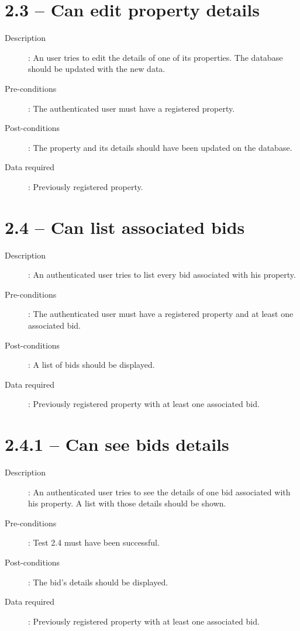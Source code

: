 \section*{2.3 – Can edit property details}
\begin{description}
    \item[Description]: An user tries to edit the details of one of its properties. The database should be updated with the new data.
    \item[Pre-conditions]: The authenticated user must have a registered property.
    \item[Post-conditions]: The property and its details should have been updated on the database.
    \item[Data required]: Previously registered property.
\end{description}


\section*{2.4 – Can list associated bids}
\begin{description}
    \item[Description]: An authenticated user tries to list every bid associated with his property.
    \item[Pre-conditions]: The authenticated user must have a registered property and at least one associated bid.
    \item[Post-conditions]: A list of bids should be displayed.
    \item[Data required]: Previously registered property with at least one associated bid.
         
\end{description}

\section*{2.4.1 – Can see bids details}

\begin{description}
    \item[Description]: An authenticated user tries to see the details of one bid associated with his property. A list with those details should be shown.
    \item[Pre-conditions]: Test 2.4 must have been successful.
    \item[Post-conditions]: The bid’s details should be displayed.
    \item[Data required]: Previously registered property with at least one associated bid.
\end{description}

